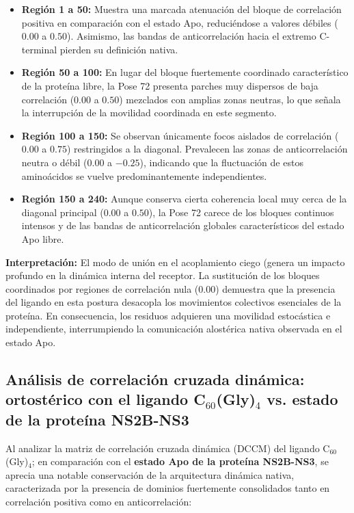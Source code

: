 \begin{itemize}
    \item \textbf{Región 1 a 50:} Muestra una marcada atenuación del bloque de correlación positiva en comparación con el estado Apo, reduciéndose a valores débiles ($0.00$ a $0.50$). Asimismo, las bandas de anticorrelación hacia el extremo C-terminal pierden su definición nativa.
    
    \item \textbf{Región 50 a 100:} En lugar del bloque fuertemente coordinado característico de la proteína libre, la Pose 72 presenta parches muy dispersos de baja correlación ($0.00$ a $0.50$) mezclados con amplias zonas neutras, lo que señala la interrupción de la movilidad coordinada en este segmento.
    
    \item \textbf{Región 100 a 150:} Se observan únicamente focos aislados de correlación ($0.00$ a $0.75$) restringidos a la diagonal. Prevalecen las zonas de anticorrelación neutra o débil ($0.00$ a $-0.25$), indicando que la fluctuación de estos aminoácidos se vuelve predominantemente independientes.
    
    \item \textbf{Región 150 a 240:} Aunque conserva cierta coherencia local muy cerca de la diagonal principal ($0.00$ a $0.50$), la Pose 72 carece de los bloques continuos intensos y de las bandas de anticorrelación globales característicos del estado Apo libre.
\end{itemize}

\textbf{Interpretación:} El modo de unión en el acoplamiento ciego (genera un impacto profundo en la dinámica interna del receptor. La sustitución de los bloques coordinados por regiones de correlación nula ($0.00$) demuestra que la presencia del ligando en esta postura desacopla los movimientos colectivos esenciales de la proteína. En consecuencia, los residuos adquieren una movilidad estocástica e independiente, interrumpiendo la comunicación alostérica nativa observada en el estado Apo.

\subsection*{Análisis de correlación cruzada dinámica: ortostérico con el ligando C$_{60}$(Gly)$_{4}$  vs. estado de la proteína NS2B-NS3}

Al analizar la matriz de correlación cruzada dinámica (DCCM) del ligando C$_{60}$(Gly)$_{4}$;  en comparación con el \textbf{estado Apo de la proteína NS2B-NS3}, se aprecia una notable conservación de la arquitectura dinámica nativa, caracterizada por la presencia de dominios fuertemente consolidados tanto en correlación positiva  como en anticorrelación:

